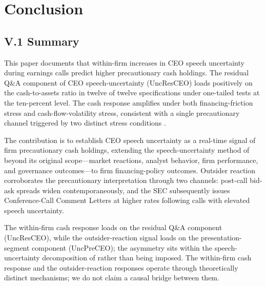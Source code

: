 
\section{Conclusion}
\label{sec:conclusion}

\subsection*{V.1 Summary}
\label{sec:conclusion:summary}

This paper documents that within-firm increases in CEO speech uncertainty during earnings calls predict higher precautionary cash holdings. The residual Q\&A component of CEO speech-uncertainty (UncResCEO) loads positively on the cash-to-assets ratio in twelve of twelve specifications under one-tailed tests at the ten-percent level. The cash response amplifies under both financing-friction stress and cash-flow-volatility stress, consistent with a single precautionary channel triggered by two distinct stress conditions \cite{almeida2004,hanqiu2007}.

The contribution is to establish CEO speech uncertainty as a real-time signal of firm precautionary cash holdings, extending the speech-uncertainty method of  beyond its original scope---market reactions, analyst behavior, firm performance, and governance outcomes---to firm financing-policy outcomes. Outsider reaction corroborates the precautionary interpretation through two channels: post-call bid-ask spreads widen contemporaneously, and the SEC subsequently issues Conference-Call Comment Letters at higher rates following calls with elevated speech uncertainty.

The within-firm cash response loads on the residual Q\&A component (UncResCEO), while the outsider-reaction signal loads on the presentation-segment component (UncPreCEO); the asymmetry sits within the speech-uncertainty decomposition of  rather than being imposed. The within-firm cash response and the outsider-reaction responses operate through theoretically distinct mechanisms; we do not claim a causal bridge between them.

